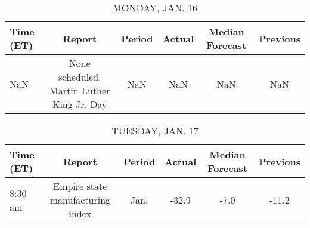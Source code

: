 \documentclass{article}%
\begin{document}
%
\normalsize%


\begin{table}[htbp]%
\caption{MONDAY, JAN. 16}%
\centering%
\begin{adjustbox}{width=1\textwidth}%
\begin{tabular}{lccccc}
\toprule
Time (ET) &                                     Report & Period & Actual & Median Forecast & Previous \\
\midrule
      NaN & None scheduled. Martin Luther King Jr. Day &    NaN &    NaN &             NaN &      NaN \\
\bottomrule
\end{tabular}
%
\end{adjustbox}%
\end{table}

%


\begin{table}[htbp]%
\caption{TUESDAY, JAN. 17}%
\centering%
\begin{adjustbox}{width=1\textwidth}%
\begin{tabular}{lccccc}
\toprule
Time (ET) &                           Report & Period & Actual & Median Forecast & Previous \\
\midrule
  8:30 am & Empire state manufacturing index &   Jan. &  -32.9 &            -7.0 &    -11.2 \\
\bottomrule
\end{tabular}
%
\end{adjustbox}%
\end{table}

%
\end{document}
